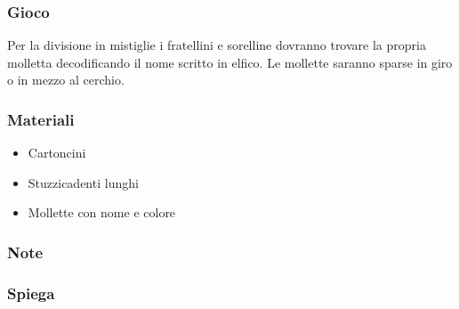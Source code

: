 \documentclass[../main.tex]{subfiles}
\begin{document}
    \subsubsection{Gioco}
    Per la divisione in mistiglie i fratellini e sorelline dovranno  trovare la propria molletta decodificando il nome scritto in elfico. Le mollette saranno sparse in giro o in mezzo al cerchio. 
    \subsubsection{Materiali}
    \begin{itemize}
        \item Cartoncini
        \item Stuzzicadenti lunghi
        \item Mollette con nome e colore
    \end{itemize}
    \subsubsection{Note}
    \subsubsection{Spiega}
\end{document}
